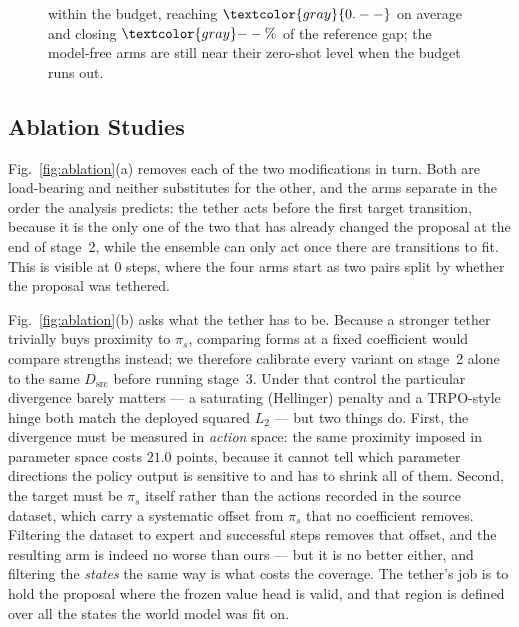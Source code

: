\documentclass{article} %
\newcommand{\ph}[1]{\textcolor{gray}{#1}}   %
\begin{document}
\begin{figure}[t]
{{  within the budget}, reaching $\ph{0.--}$ on average and closing $\ph{--\%}$
  of the reference gap; the model-free arms are still near their zero-shot level
  when the budget runs out.
}
\label{fig:main-sim2sim}
\end{figure}

\subsection{Ablation Studies}
\label{sec:ablation}



Fig.~\ref{fig:ablation}(a) removes each of the two modifications in turn. Both
are load-bearing and neither substitutes for the other, and the arms separate in
the order the analysis predicts: the tether acts before the first target
transition, because it is the only one of the two that has already changed the
proposal at the end of stage~2, while the ensemble can only act once there are
transitions to fit. This is visible at $0$ steps, where the four arms start as
two pairs split by whether the proposal was tethered.

Fig.~\ref{fig:ablation}(b) asks what the tether has to be. Because a stronger
tether trivially buys proximity to $\pi_s$, comparing forms at a fixed
coefficient would compare strengths instead; we therefore calibrate every
variant on stage~2 alone to the same $D_{\mathrm{src}}$ before running
stage~3. Under that control the particular divergence barely matters --- a
saturating (Hellinger) penalty and a TRPO-style hinge both match the deployed
squared $L_2$ --- but two things do. First, the divergence must be measured in
\emph{action} space: the same proximity imposed in parameter space costs
$21.0$ points, because it cannot tell which parameter directions the policy
output is sensitive to and has to shrink all of them. Second, the target must be
$\pi_s$ itself rather than the actions recorded in the source dataset, which
carry a systematic offset from $\pi_s$ that no coefficient removes. Filtering
the dataset to expert and successful steps removes that offset, and the
resulting arm is indeed no worse than ours --- but it is no better either, and
filtering the \emph{states} the same way is what costs the coverage. The
tether's job is to hold the proposal where the frozen value head is valid, and
that region is defined over all the states the world model was fit on.
\end{document}
